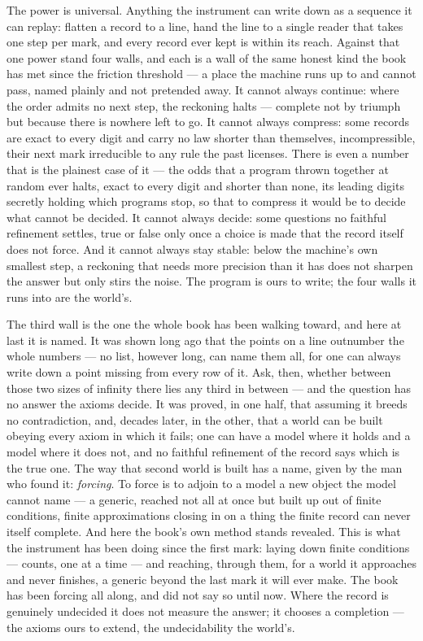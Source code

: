 The power is universal. Anything the instrument can write down as a sequence it can replay: flatten a record to
a line, hand the line to a single reader that takes one step per mark, and every record ever kept is within its
reach. Against that one power stand four walls, and each is a wall of the same honest kind the book has met
since the friction threshold --- a place the machine runs up to and cannot pass, named plainly and not
pretended away. It cannot always continue: where the order admits no next step, the reckoning halts --- complete
not by triumph but because there is nowhere left to go. It cannot always compress: some records are exact to
every digit and carry no law shorter than themselves, incompressible, their next mark irreducible to any rule
the past licenses. There is even a number that is the plainest case of it --- the odds that a program thrown
together at random ever halts, exact to every digit and shorter than none, its leading digits secretly holding
which programs stop, so that to compress it would be to decide what cannot be decided. It cannot always decide: some questions no faithful refinement settles, true or false only
once a choice is made that the record itself does not force. And it cannot always stay stable: below the
machine's own smallest step, a reckoning that needs more precision than it has does not sharpen the answer but
only stirs the noise. The program is ours to write; the four walls it runs into are the world's.

The third wall is the one the whole book has been walking toward, and here at last it is named. It was shown
long ago that the points on a line outnumber the whole numbers --- no list, however long, can name them all, for
one can always write down a point missing from every row of it. Ask, then, whether between those two sizes of
infinity there lies any third in between --- and the question has no answer the axioms decide. It was proved, in
one half, that assuming it breeds no contradiction, and, decades later, in the other, that a world can be built
obeying every axiom in which it fails; one can have a model where it holds and a model where it does not, and no
faithful refinement of the record says which is the true one. The way that second world
is built has a name, given by the man who found it: \emph{forcing}. To force is to adjoin to a model a new
object the model cannot name --- a generic, reached not all at once but built up out of finite conditions,
finite approximations closing in on a thing the finite record can never itself complete. And here the book's own
method stands revealed. This is what the instrument has been doing since the first mark: laying down finite
conditions --- counts, one at a time --- and reaching, through them, for a world it approaches and never
finishes, a generic beyond the last mark it will ever make. The book has been forcing all along, and did not say
so until now. Where the record is genuinely undecided it does not measure the answer; it chooses a completion
--- the axioms ours to extend, the undecidability the world's.

